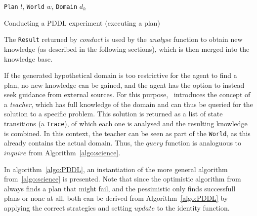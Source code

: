 \documentclass[../Master.tex]{subfiles}
\begin{document}
\begin{algorithm}
    \begin{algorithmic}
         {\texttt{Plan} $l$, \texttt{World} $w$, \texttt{Domain} $d_h$}
            \EndIf%
        \EndFor%
        \EndFunction%
    \end{algorithmic}
    \caption{Conducting a PDDL experiment (executing a plan)}\label{algo:PDDLConduct}
\end{algorithm}

The \texttt{Result} returned by \textit{conduct} is used by the \textit{analyse} function to obtain new knowledge (as described in the following sections), which is then merged into the knowledge base.

If the generated hypothetical domain is too restrictive for the agent to find a plan, no new knowledge can be gained, and the agent has the option to instead seek guidance from external sources. For this purpose,~\cite{Walsh2008} introduces the concept of a \textit{teacher}, which has full knowledge of the domain and can thus be queried for the solution to a specific problem. This solution is returned as a list of state transitions (a \texttt{Trace}), of which each one is analysed and the resulting knowledge is combined. In this context, the teacher can be seen as part of the \texttt{World}, as this already contains the actual domain. Thus, the $query$ function is analoguous to $inquire$ from Algorithm~\ref{algo:science}.

In algorithm~\ref{algo:PDDL}, an instantiation of the more general algorithm from~\ref{algo:science} is presented. Note that since the optimistic algorithm from~\cite{Walsh2008} always finds a plan that might fail, and the pessimistic only finds successfull plans or none at all, both can be derived from Algorithm~\ref{algo:PDDL} by applying the correct strategies and setting $update$ to the identity function.
\end{document}
